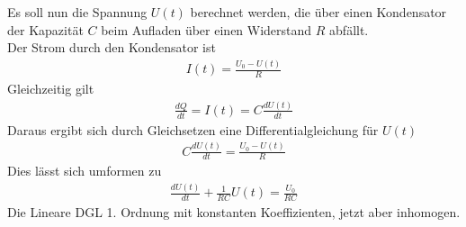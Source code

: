 \documentclass{scrartcl}
\begin{document}
\noindent Es soll nun die Spannung $U(t)$ berechnet werden,
die über einen Kondensator der Kapazität $C$ beim Aufladen über einen Widerstand $R$ 
abfällt.\\
Der Strom durch den Kondensator ist 
\begin{align}
    I(t)=\frac{U_0-U(t)}{R}
\end{align}
Gleichzeitig gilt
\begin{align}
    \frac{d Q}{dt}=I(t)=C\frac{dU(t)}{dt}
\end{align}
Daraus ergibt sich durch Gleichsetzen eine Differentialgleichung für $U(t)$
\begin{align}
    C\frac{dU(t)}{dt}=\frac{U_0-U(t)}{R}
\end{align}
Dies lässt sich umformen zu 
\begin{align}
    \frac{dU(t)}{dt}+\frac{1}{RC}U(t)=\frac{U_0}{RC}
\end{align}
Die Lineare DGL 1. Ordnung mit konstanten Koeffizienten, jetzt aber inhomogen.\\
\end{document}
